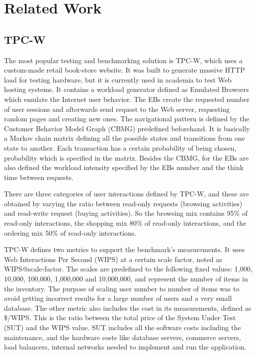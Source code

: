 \chapter{Related Work}
\label{chapter:chapter2}

\section{TPC-W}
\label{sec:tpcw}

The most popular testing and benchmarking solution is TPC-W, which uses a custom-made retail book-store website. It was built to generate massive HTTP load for testing hardware, but it is currently used in academia to test Web hosting systems. It contains a workload generator defined as Emulated Browsers which emulate the Internet user behavior. The EBs create the requested number of user sessions and afterwards send request to the Web server, requesting random pages and creating new ones. The navigational pattern is defined by the Customer Behavior Model Graph (CBMG) predefined beforehand. It is basically a Markov chain matrix defining all the possible states and transitions from one state to another. Each transaction has a certain probability of being chosen, probability which is specified in the matrix. Besides the CBMG, for the EBs are also defined the workload intensity specified by the EBs number and the think time between requests.

There are three categories of user interactions defined by TPC-W, and these are obtained by varying the ratio between read-only requests (browsing activities) and read-write request (buying activities). So the browsing mix contains 95\% of read-only interactions, the shopping mix 80\% of read-only interactions, and the  ordering mix 50\% of  read-only interactions.

TPC-W defines two metrics to support the benchmark's measurements. It uses Web Interactions Per Second (WIPS) at a certain scale factor, noted as WIPS@scale-factor. The scales are predefined to the following fixed values: 1,000, 10,000, 100,000, 1,000,000 and 10,000,000, and represent the number of items in the inventory. The purpose of scaling user number to number of items was to avoid getting incorrect results for a large number of users and a very small database. The other metric also includes the cost in its measurements, defined as \$/WIPS. This is the ratio between the total price of the System Under Test (SUT) and the WIPS value. SUT includes all the software costs including the maintenance, and the hardware costs like database servers, commerce servers, load balancers, internal networks needed to implement and run the application.

